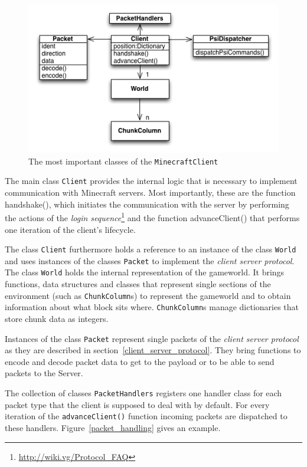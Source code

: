 
\begin{figure}[h]
  \centering
    \includegraphics[width=12cm]{graphics/spockUML_v14}
  \caption{The most important classes of the \texttt{MinecraftClient}}
  \label{spock_UML}
\end{figure}

The main class \texttt{Client} provides the internal logic that is necessary to implement communication with Minecraft servers. Most importantly, these are the function handshake(), which initiates the communication with the server by performing the actions of the \emph{login sequence}\footnote{\url{http://wiki.vg/Protocol_FAQ}} and the function advanceClient() that performs one iteration of the client's lifecycle.


The class \texttt{Client} furthermore holds a reference to an instance of the class \texttt{World} and uses instances of the classes \texttt{Packet} to implement the \emph{client server protocol}. The class \texttt{World} holds the internal representation of the gameworld. It brings functions, data structures and classes that represent single sections of the environment (such as \texttt{ChunkColumn}s) to represent the gameworld and to obtain information about what block sits where. \texttt{ChunkColumn}s manage dictionaries that store chunk data as integers.

Instances of the class \texttt{Packet} represent single packets of the \emph{client server protocol} as they are described in section~\ref{client_server_protocol}. They bring functions to encode and decode packet data to get to the payload or to be able to send packets to the Server.

The collection of classes \texttt{PacketHandlers} registers one handler class for each packet type that the client is supposed to deal with by default. For every iteration of the \texttt{advanceClient()} function incoming packets are dispatched to these handlers. Figure~\ref{packet_handling} gives an example.


